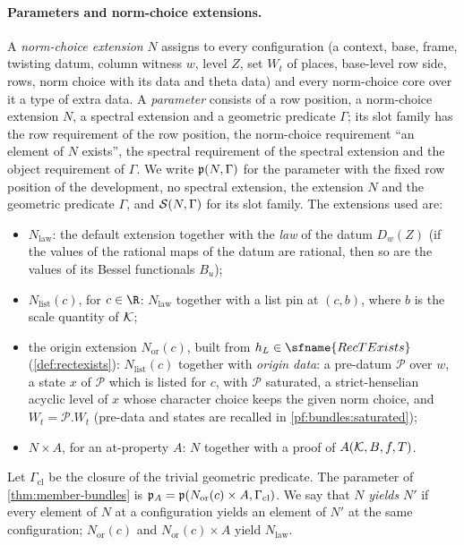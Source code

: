 \paragraph{Parameters and norm-choice extensions.}
A \emph{norm-choice extension} $N$ assigns to every configuration (a context, base, frame, twisting datum, column witness $w$,
level $Z$, set $W_t$ of places, base-level row side, rows, norm choice with its data and theta data) and every norm-choice
core over it a type of extra data. A \emph{parameter} consists of a row position, a norm-choice extension $N$, a spectral
extension and a geometric predicate $\Gamma$; its slot family has the row requirement of the row position, the norm-choice
requirement ``an element of $N$ exists'', the spectral requirement of the spectral extension and the object requirement of
$\Gamma$. We write $\mathfrak p(N,\Gamma)$ for the parameter with the fixed row position of the development, no spectral extension,
the extension $N$ and the geometric predicate $\Gamma$, and $\mathcal S(N,\Gamma)$ for its slot family. The extensions used are:
\begin{itemize}
\item $N_{\mathrm{law}}$: the default extension together with the \emph{law} of the datum $D_w(Z)$ (if the values of the
rational maps of the datum are rational, then so are the values of its Bessel functionals $B_u$);
\item $N_{\mathrm{list}}(c)$, for $c\in\R$: $N_{\mathrm{law}}$ together with a list pin at $(c,b)$, where $b$ is the scale
quantity of $\mathcal K$;
\item the origin extension $N_{\mathrm{or}}(c)$, built from $h_L\in\sfname{RecTExists}$ (\cref{def:rectexists}):
$N_{\mathrm{list}}(c)$ together with \emph{origin data}: a pre-datum $\mathcal P$ over $w$, a state $x$ of $\mathcal P$ which is
listed for $c$, with $\mathcal P$ saturated, a strict-henselian acyclic level of $x$ whose character choice keeps the given norm
choice, and $W_t=\mathcal P.W_t$ (pre-data and states are recalled in \cref{pf:bundles:saturated});
\item $N\times A$, for an at-property $A$: $N$ together with a proof of $A(\mathcal K,B,f,T)$.
\end{itemize}
Let $\Gamma_{\mathrm{cl}}$ be the closure of the trivial geometric predicate. The parameter of \cref{thm:member-bundles} is
$\mathfrak p_A=\mathfrak p(N_{\mathrm{or}}(c)\times A,\Gamma_{\mathrm{cl}})$. We say that $N$ \emph{yields} $N'$ if every element of $N$ at
a configuration yields an element of $N'$ at the same configuration; $N_{\mathrm{or}}(c)$ and $N_{\mathrm{or}}(c)\times A$
yield $N_{\mathrm{law}}$.

